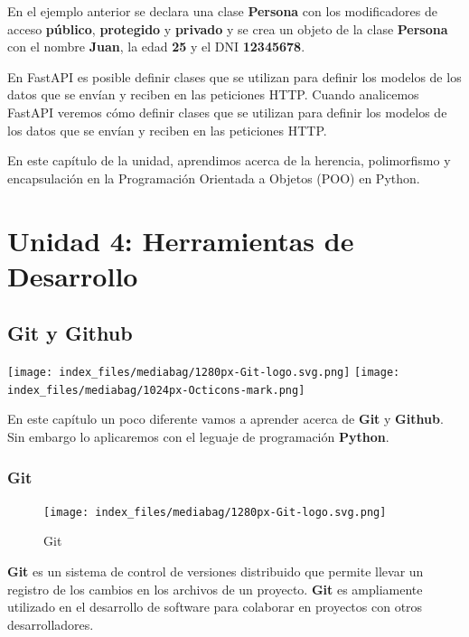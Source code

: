 \documentclass[
  a4paper,
  DIV=11,
  numbers=noendperiod,
  onepage,
  openany]{scrreprt}
\begin{document}
En el ejemplo anterior se declara una clase \textbf{Persona} con los
modificadores de acceso \textbf{público}, \textbf{protegido} y
\textbf{privado} y se crea un objeto de la clase \textbf{Persona} con el
nombre \textbf{Juan}, la edad \textbf{25} y el DNI \textbf{12345678}.

En FastAPI es posible definir clases que se utilizan para definir los
modelos de los datos que se envían y reciben en las peticiones HTTP.
Cuando analicemos FastAPI veremos cómo definir clases que se utilizan
para definir los modelos de los datos que se envían y reciben en las
peticiones HTTP.

En este capítulo de la unidad, aprendimos acerca de la herencia,
polimorfismo y encapsulación en la Programación Orientada a Objetos
(POO) en Python.

\part{Unidad 4: Herramientas de Desarrollo}

\chapter{Git y Github}\label{git-y-github}

\texttt{[image: index\_files/mediabag/1280px-Git-logo.svg.png]}
\texttt{[image: index\_files/mediabag/1024px-Octicons-mark.png]}

En este capítulo un poco diferente vamos a aprender acerca de
\textbf{Git} y \textbf{Github}. Sin embargo lo aplicaremos con el
leguaje de programación \textbf{Python}.

\section{Git}\label{git}

\begin{figure}[H]

{\centering \texttt{[image: index\_files/mediabag/1280px-Git-logo.svg.png]}

}

\caption{Git}

\end{figure}%

\textbf{Git} es un sistema de control de versiones distribuido que
permite llevar un registro de los cambios en los archivos de un
proyecto. \textbf{Git} es ampliamente utilizado en el desarrollo de
software para colaborar en proyectos con otros desarrolladores.
\end{document}
